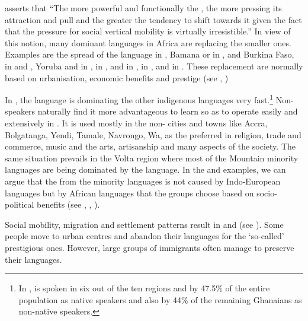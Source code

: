\documentclass[output=paper,
modfonts
]{langscibook}
\begin{document}
\citet[286]{Adegbija2001} asserts that “The more powerful and functionally the , the more pressing its attraction and pull and the greater the tendency to shift towards it given the fact that the pressure for social vertical mobility is virtually irresistible.” In view of this notion, many dominant languages in Africa are replacing the smaller ones. Examples are the spread of the  language in , Bamana or  in , and Burkina Faso,  in  and , Yoruba and  in ,  in , and  in ,  in ,  and  in . These replacement are normally based on urbanisation, economic benefits and prestige (see \citealt[160]{Mous2003}, \citealt[286]{Adegbija2001})

In , the  language is dominating the other indigenous languages very fast.\footnote{In ,  is spoken in six out of the ten regions and by 47.5\% of the entire population as native speakers and also by 44\% of the remaining Ghanaians as non-native speakers.}{ } Non- speakers naturally find it more advantageous to learn  so as to operate easily and extensively in . It is used mostly in the non- cities and  towns like Accra, Bolgatanga, Yendi, Tamale, Navrongo, Wa, as the preferred  in religion, trade and commerce, music and the arts, artisanship and many aspects of the society. The same situation prevails in the Volta region where most of the  Mountain minority languages are being dominated by the  language. In the  and  examples, we can argue that the  from the minority languages is not caused by Indo-European languages but by African languages that the groups choose based on socio-political benefits (see \citealt{Mous2003}, \citealt{Brenzinger1998}, \citealt{Lüpke2013}).

Social mobility, migration and settlement patterns result in  and  (see \citealt{Agyekum2009}). Some people move to urban centres and abandon their languages for the ‘so-called’ prestigious ones. However, large groups of immigrants often manage to preserve their languages. 


\end{document}
